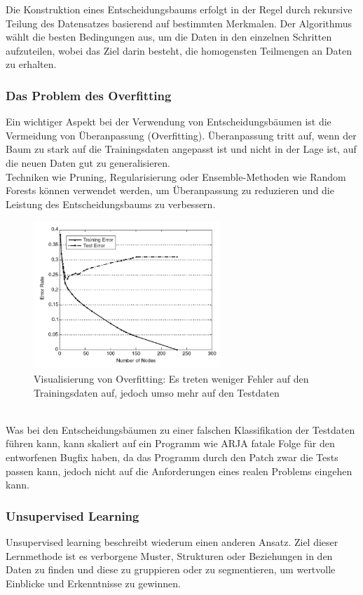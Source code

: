 \documentclass[11pt,a4paper]{article}
\begin{document}
Die Konstruktion eines Entscheidungsbaums erfolgt in der Regel durch rekursive Teilung des Datensatzes basierend auf bestimmten Merkmalen. Der Algorithmus wählt die besten Bedingungen aus, um die Daten in den einzelnen Schritten aufzuteilen, wobei das Ziel darin besteht, die homogensten Teilmengen an Daten zu erhalten.
\subsubsection{Das Problem des Overfitting}
Ein wichtiger Aspekt bei der Verwendung von Entscheidungsbäumen ist die Vermeidung von Überanpassung (Overfitting). Überanpassung tritt auf, wenn der Baum zu stark auf die Trainingsdaten angepasst ist und nicht in der Lage ist, auf die neuen Daten gut zu generalisieren.  \\Techniken wie Pruning, Regularisierung oder Ensemble-Methoden wie Random Forests können verwendet werden, um Überanpassung zu reduzieren und die Leistung des Entscheidungsbaums zu verbessern.
\begin{figure}[h!]
\includegraphics[width=70mm,scale=0.3, center]{overfitting.png}
\caption{Visualisierung von Overfitting: Es treten weniger Fehler auf den Trainingsdaten auf, jedoch umso mehr auf den Testdaten}
\label{fig:figure3}
\end{figure}
\\Was bei den Entscheidungsbäumen zu einer falschen Klassifikation der Testdaten führen kann, kann skaliert auf ein Programm wie ARJA fatale Folge für den entworfenen Bugfix haben, da das Programm durch den Patch zwar die Tests passen kann, jedoch nicht auf die Anforderungen eines realen Problems eingehen kann. 

\subsubsection{Unsupervised Learning}
Unsupervised learning beschreibt wiederum einen anderen Ansatz. Ziel dieser Lernmethode ist es verborgene Muster, Strukturen oder Beziehungen in den Daten zu finden und diese zu gruppieren oder zu segmentieren, um wertvolle Einblicke und Erkenntnisse zu gewinnen. 
\end{document}
